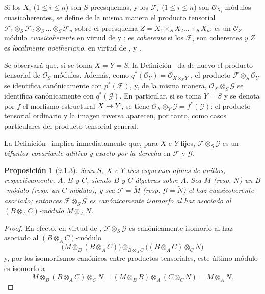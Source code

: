 \documentclass[oneside]{amsart}
\theoremstyle{ega-env-style}
\theoremstyle{ega-thm-env-style}
\newtheorem*{proposition}{Proposición}
\theoremstyle{ega-defn-env-style}
\def\leq{\leqslant}                 %
\renewcommand{\to}{\mathchoice{\longrightarrow}{\rightarrow}{\rightarrow}{\rightarrow}}
\newcommand{\oldpage}[2][]{{\marginnote{\normalfont{\textbf{#1}~|~#2}}}\ignorespaces}
\let\EGAOriginalLabel\label
\renewcommand{\label}[1]{\phantomsection\EGAOriginalLabel{#1}}
\begin{document}
Si los $X_i$ ($1\leq i\leq n$) son $S$-preesquemas, y los $\mathscr{F}_i$ ($1\leq i\leq n$) son
$\mathscr{O}_{X_i}$-módulos cuasicoherentes, se define de la misma manera el producto tensorial
$\mathscr{F}_1\otimes_S\mathscr{F}_2\otimes_S\ldots\otimes_S\mathscr{F}_n$ sobre el
preesquema $Z=X_1\times_S X_2\ldots\times_S X_n$; es un
$\mathscr{O}_Z$-módulo \emph{cuasicoherente} en virtud de  y
; es \emph{coherente} si los $\mathscr{F}_i$ son coherentes \emph{y}
$Z$ es \emph{localmente noetheriano}, en virtud de ,
 y .

Se observará que, si se toma $X=Y=S$, la Definición~ da de nuevo el producto
tensorial de $\mathscr{O}_S$-módulos. Además, como $q^*(\mathscr{O}_Y)=\mathscr{O}_{X\times_S Y}$
, el producto $\mathscr{F}\otimes_S\mathscr{O}_Y$ se identifica
canónicamente con $p^*(\mathscr{F})$, y, de la misma manera,
$\mathscr{O}_X\otimes_S\mathscr{G}$ se identifica canónicamente con $q^*(\mathscr{G})$. En
particular, si se toma $Y=S$ y se denota por $f$ el morfismo estructural $X\to Y$,
se tiene $\mathscr{O}_X\otimes_Y\mathscr{G}=f^*(\mathscr{G})$: el producto tensorial ordinario
y la imagen inversa aparecen, por tanto, como casos particulares del producto
tensorial general.

La Definición~ implica inmediatamente que, para $X$ e
$Y$ fijos, $\mathscr{F}\otimes_S\mathscr{G}$ es un \emph{bifuntor covariante aditivo y exacto por la derecha} en $\mathscr{F}$ y $\mathscr{G}$.

\begin{proposition}[9.1.3]
\label{I.9.1.3}
Sean $S$, $X$ e $Y$ tres esquemas afines de anillos,
respectivamente, $A$, $B$ y $C$, siendo $B$ y $C$ álgebras sobre $A$. Sea $M$
\textup{(resp. $N$)} un $B$-módulo \textup{(resp.} un $C$-módulo), y sea
$\mathscr{F}=\widetilde{M}$ \textup{(resp.} $\mathscr{G}=\widetilde{N}$) el
haz cuasicoherente asociado; entonces $\mathscr{F}\otimes_S\mathscr{G}$ es
canónicamente isomorfo al haz asociado al $(B\otimes_A C)$-módulo
$M\otimes_A N$.
\end{proposition}

\begin{proof}
\oldpage[I]{170}
En efecto, en virtud de , $\mathscr{F}\otimes_S\mathscr{G}$
es canónicamente isomorfo al haz asociado al $(B\otimes_A C)$-módulo
\[
  \bigl(M\otimes_B(B\otimes_A C)\bigr)
  \otimes_{B\otimes_A C}
  \bigl((B\otimes_A C)\otimes_C N\bigr)
\]
y, por los isomorfismos canónicos entre productos tensoriales, este último módulo es isomorfo a
\[
  M\otimes_B(B\otimes_A C)\otimes_C N
  =(M\otimes_B B)\otimes_A(C\otimes_C N)=M\otimes_A N.
\]
\end{proof}
\end{document}
